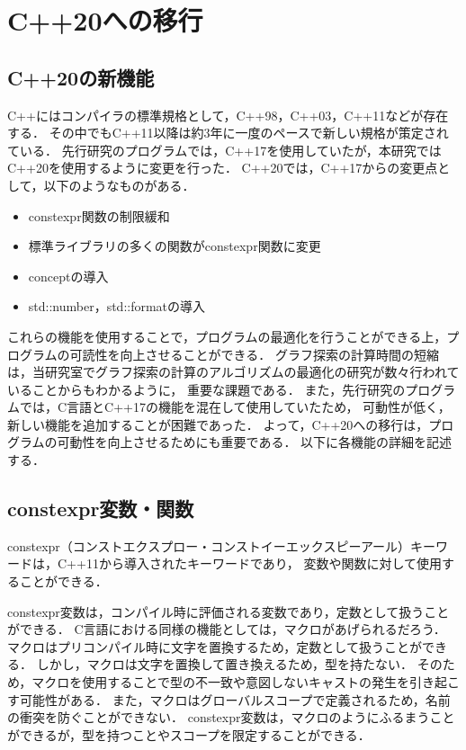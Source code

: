 
\chapter{C++20への移行}\label{chapter:appendix_cpp20}
\section{C++20の新機能}
C++にはコンパイラの標準規格として，C++98，C++03，C++11などが存在する．
その中でもC++11以降は約3年に一度のペースで新しい規格が策定されている．
先行研究のプログラムでは，C++17を使用していたが，本研究ではC++20\cite{Thomas_C++20}を使用するように変更を行った．
C++20では，C++17からの変更点として，以下のようなものがある．
\begin{itemize}
  \item constexpr関数の制限緩和
  \item 標準ライブラリの多くの関数がconstexpr関数に変更
  \item conceptの導入
  \item std::number，std::formatの導入
\end{itemize}
これらの機能を使用することで，プログラムの最適化を行うことができる上，プログラムの可読性を向上させることができる．
グラフ探索の計算時間の短縮は，当研究室でグラフ探索の計算のアルゴリズムの最適化の研究が数々行われていることからもわかるように，
重要な課題である．
また，先行研究のプログラムでは，C言語とC++17の機能を混在して使用していたため，
可動性が低く，新しい機能を追加することが困難であった．
よって，C++20への移行は，プログラムの可動性を向上させるためにも重要である．
以下に各機能の詳細を記述する．

\section{constexpr変数・関数}
constexpr（コンストエクスプロー・コンストイーエックスピーアール）キーワードは，C++11から導入されたキーワードであり，
変数や関数に対して使用することができる．

constexpr変数は，コンパイル時に評価される変数であり，定数として扱うことができる．
C言語における同様の機能としては，マクロがあげられるだろう．
マクロはプリコンパイル時に文字を置換するため，定数として扱うことができる．
しかし，マクロは文字を置換して置き換えるため，型を持たない．
そのため，マクロを使用することで型の不一致や意図しないキャストの発生を引き起こす可能性がある．
また，マクロはグローバルスコープで定義されるため，名前の衝突を防ぐことができない．
constexpr変数は，マクロのようにふるまうことができるが，型を持つことやスコープを限定することができる．

